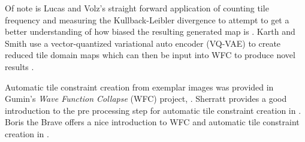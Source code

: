 Of note is Lucas and Volz's straight forward application of counting tile frequency and measuring the Kullback-Leibler divergence
to attempt to get a better understanding of how biased the resulting generated map is \cite{Lucas_Volz_2019}.
Karth and Smith use a vector-quantized variational auto encoder (VQ-VAE) to create reduced tile domain maps which can then
be input into WFC to produce novel results \cite{Karth_Smith_2017}.

Automatic tile constraint creation from exemplar images was provided in Gumin's \textit{Wave Function Collapse} (WFC) project, \cite{Gumin_2016}.
Sherratt provides a good introduction to the pre processing step for automatic tile constraint creation in \cite{Sherratt_2019}.
Boris the Brave offers a nice introduction to WFC and automatic tile constraint creation in \cite{BorisTheBrave_wfc_2021}.


